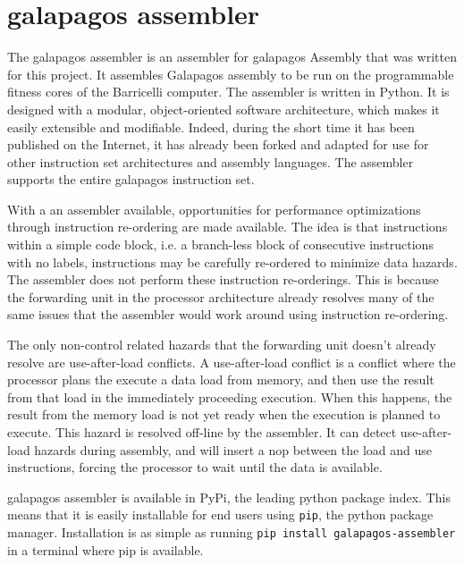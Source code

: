\section{\Gls{galapagos assembler}}

The \Gls{galapagos assembler} is an assembler for \Gls{galapagos} Assembly that was written for this project.
It assembles Galapagos assembly to be run on the programmable fitness cores of the Barricelli computer.
The assembler is written in Python. 
It is designed with a modular, object-oriented software architecture, which makes it easily extensible and modifiable.
Indeed, during the short time it has been published on the Internet, it has already been forked and adapted for use for other instruction set architectures and assembly languages.\cn {}
The assembler supports the entire \Gls{galapagos} instruction set.

With a an assembler available, opportunities for performance optimizations through instruction re-ordering are made available.
The idea is that instructions within a simple code block, i.e. a branch-less block of consecutive instructions with no labels, instructions may be carefully re-ordered to minimize data hazards.
The assembler does not perform these instruction re-orderings.
This is because the forwarding unit in the processor architecture already resolves many of the same issues that the assembler would work around using instruction re-ordering.

The only non-control related hazards that the forwarding unit doesn't already resolve are use-after-load conflicts.
A use-after-load conflict is a conflict where the processor plans the execute a data load from memory, and then use the result from that load in the immediately proceeding execution.
When this happens, the result from the memory load is not yet ready when the execution is planned to execute.
This hazard is resolved off-line by the assembler.
It can detect use-after-load hazards during assembly, and will insert a \gls{nop} between the load and use instructions, forcing the processor to wait until the data is available.

\Gls{galapagos assembler} is available in PyPi, the leading python package index.
This means that it is easily installable for end users using \texttt{pip}, the python package manager.
Installation is as simple as running \texttt{pip install galapagos-assembler} in a terminal where pip is available.

